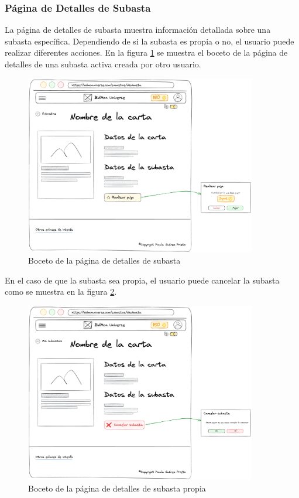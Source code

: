 \subsubsection{Página de Detalles de Subasta}
La página de detalles de subasta muestra información detallada sobre una subasta específica.
Dependiendo de si la subasta es propia o no, el usuario puede realizar diferentes acciones.
En la figura \ref{fig:p_auction_details} se muestra el boceto de la página de detalles de una subasta activa creada por otro usuario.
\begin{figure}[H]
    \centering
    \includegraphics[width=0.9\textwidth]{figures/6-Analisis/6-Interfaz/prototipos/detalle-subasta.png}
    \caption{Boceto de la página de detalles de subasta}
    \label{fig:p_auction_details}
\end{figure}

En el caso de que la subasta sea propia, el usuario puede cancelar la subasta como se muestra en la figura \ref{fig:p_auction_details_own}.
\begin{figure}[H]
    \centering
    \includegraphics[width=0.9\textwidth]{figures/6-Analisis/6-Interfaz/prototipos/detalle-subasta-propia.png}
    \caption{Boceto de la página de detalles de subasta propia}
    \label{fig:p_auction_details_own}
\end{figure}

